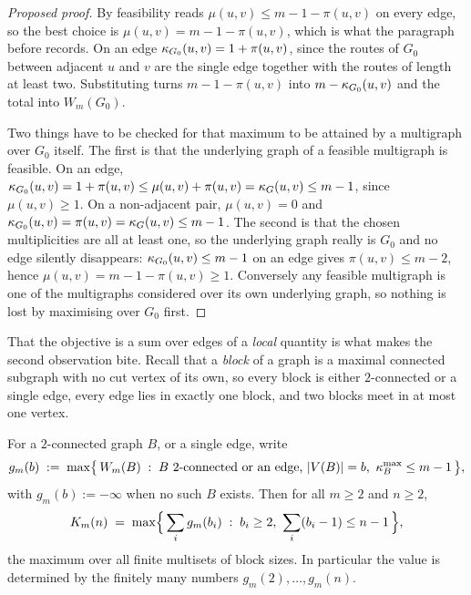 \begin{proof}[Proposed proof]
By  feasibility reads $\mu(u,v) \le m-1-\pi(u,v)$ on every edge, so the best choice is $\mu(u,v) = m-1-\pi(u,v)$, which is what the paragraph before  records. On an edge $\kappa_{G_0}(u,v) = 1 + \pi(u,v)$, since the routes of $G_0$ between adjacent $u$ and $v$ are the single edge together with the routes of length at least two. Substituting turns $m-1-\pi(u,v)$ into $m - \kappa_{G_0}(u,v)$ and the total into $W_m(G_0)$.

Two things have to be checked for that maximum to be attained by a multigraph over $G_0$ itself. The first is that the underlying graph of a feasible multigraph is feasible. On an edge, $\kappa_{G_0}(u,v) = 1 + \pi(u,v) \le \mu(u,v) + \pi(u,v) = \kappa_G(u,v) \le m-1$, since $\mu(u,v) \ge 1$. On a non-adjacent pair, $\mu(u,v) = 0$ and $\kappa_{G_0}(u,v) = \pi(u,v) = \kappa_G(u,v) \le m-1$. The second is that the chosen multiplicities are all at least one, so the underlying graph really is $G_0$ and no edge silently disappears: $\kappa_{G_0}(u,v) \le m-1$ on an edge gives $\pi(u,v) \le m-2$, hence $\mu(u,v) = m-1-\pi(u,v) \ge 1$. Conversely any feasible multigraph is one of the multigraphs considered over its own underlying graph, so nothing is lost by maximising over $G_0$ first.
\end{proof}

That the objective is a sum over edges of a \emph{local} quantity is what makes the second observation bite. Recall that a \emph{block} of a graph is a maximal connected subgraph with no cut vertex of its own, so every block is either $2$-connected or a single edge, every edge lies in exactly one block, and two blocks meet in at most one vertex.

\begin{conjecture}\label{thm:multi-vertex-blocks}
For a $2$-connected graph $B$, or a single edge, write
\[
    g_m(b) \;:=\; \max\bigl\{\, W_m(B) \;:\; B \text{ $2$-connected or an edge, } |V(B)| = b,\ \kappa^{\max}_B \le m-1 \,\bigr\} ,
\]
with $g_m(b) := -\infty$ when no such $B$ exists. Then for all $m \ge 2$ and $n \ge 2$,
\[
    K_m(n)
    \;=\; \max\Bigl\{\, \sum_{i} g_m(b_i) \;:\; b_i \ge 2,\ \sum_i (b_i - 1) \le n-1 \,\Bigr\} ,
\]
the maximum over all finite multisets of block sizes. In particular the value is determined by the finitely many numbers $g_m(2), \dots, g_m(n)$.
\end{conjecture}


